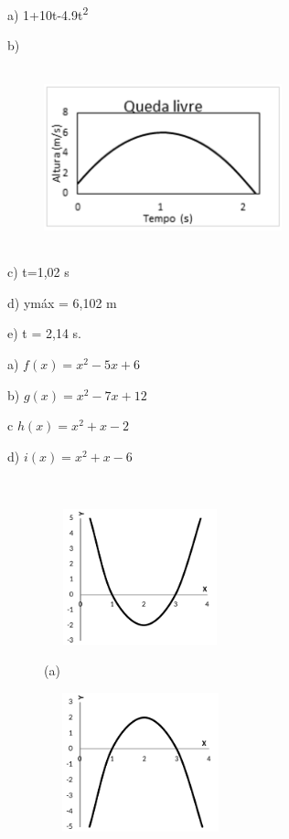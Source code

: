 \begin{enumerate}[label=\thechapter.\arabic*]
\ansitem{} a) 1+10t-4.9t\textsuperscript{2} 

b) 

\begin{figure}[H]
	\begin{Center}
		\includegraphics[width=2.71in,height=2.04in]{capitulos/funcao_do_segundo_grau/media/image37.png}
	\end{Center}
\end{figure}

	c) t=1,02 s

	d) ymáx = 6,102 m

	e) t = 2,14 s.

\ansitem{} a)  \( f \left( x \right) =x^{2}-5x+6 \)

    b) \( g \left( x \right) =x^{2}-7x+12 \) 

	c  \( h \left( x \right) =x^{2}+x-2 \)

	d)  \( i \left( x \right) =x^{2}+x-6 \)

\ansitem{} ~

\begin{multicols}{2}
\begin{figure}[H]
        \includegraphics[width=2.19in,height=1.55in]{capitulos/funcao_do_segundo_grau/media/image38.pdf}
        
        (a)
\end{figure}

\begin{figure}[H]
        \includegraphics[width=2.2in,height=1.58in]{capitulos/funcao_do_segundo_grau/media/image39.pdf}
        

\end{figure}
\end{multicols}
\end{enumerate}
